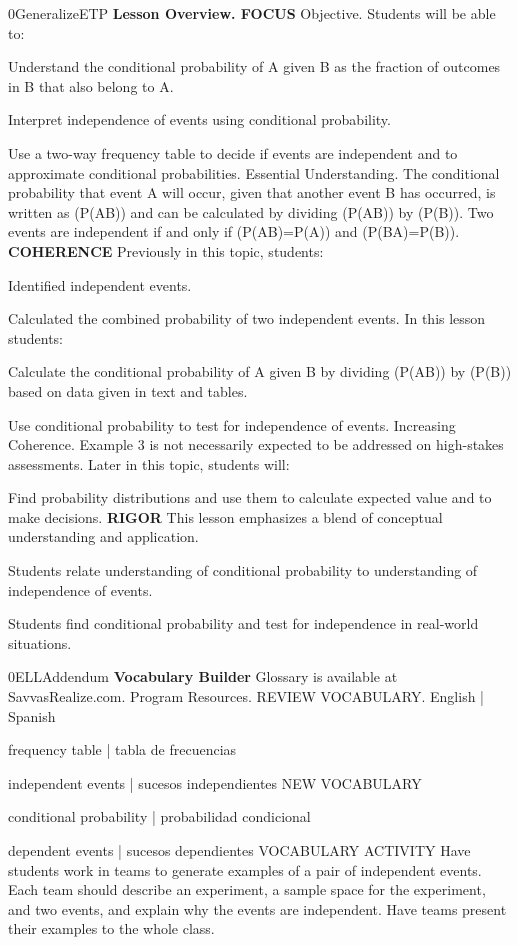 \documentclass{article}
\newenvironment{te-addendum}[2]{}{}     %
\begin{document}
\begin{te-addendum}{0}{GeneralizeETP}
\textbf{Lesson Overview. FOCUS}
Objective. Students will be able to:
\item Understand the conditional probability of A given B as the fraction of outcomes in B that also belong to A.
\item Interpret independence of events using conditional probability.
\item Use a two-way frequency table to decide if events are independent and to approximate conditional probabilities.
Essential Understanding. The conditional probability that event A will occur, given that another event B has occurred, is written as (P(A\mid B)) and can be calculated by dividing (P(AB)) by (P(B)). Two events are independent if and only if (P(A\mid B)=P(A)) and (P(B\mid A)=P(B)).
\textbf{COHERENCE}
Previously in this topic, students:
\item Identified independent events.
\item Calculated the combined probability of two independent events.
In this lesson students:
\item Calculate the conditional probability of A given B by dividing (P(AB)) by (P(B)) based on data given in text and tables.
\item Use conditional probability to test for independence of events.
Increasing Coherence. Example 3 is not necessarily expected to be addressed on high-stakes assessments.
Later in this topic, students will:
\item Find probability distributions and use them to calculate expected value and to make decisions.
\textbf{RIGOR}
This lesson emphasizes a blend of conceptual understanding and application.
\item Students relate understanding of conditional probability to understanding of independence of events.
\item Students find conditional probability and test for independence in real-world situations.
\end{te-addendum}
\begin{te-addendum}{0}{ELLAddendum}
\textbf{Vocabulary Builder}
Glossary is available at SavvasRealize.com. Program Resources.
REVIEW VOCABULARY. English | Spanish
\item frequency table | tabla de frecuencias
\item independent events | sucesos independientes
NEW VOCABULARY
\item conditional probability | probabilidad condicional
\item dependent events | sucesos dependientes
VOCABULARY ACTIVITY
Have students work in teams to generate examples of a pair of independent events. Each team should describe an experiment, a sample space for the experiment, and two events, and explain why the events are independent. Have teams present their examples to the whole class.
\end{te-addendum}
\end{document}

